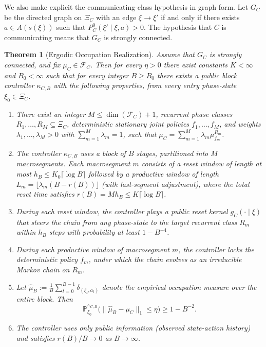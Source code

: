 \documentclass[12pt,a4paper]{article}
\newtheorem{theorem}{Theorem}[section]
\theoremstyle{definition}
\begin{document}
We also make explicit the communicating-class hypothesis in graph form. Let $G_C$ be the directed graph on $\Xi_C$ with an edge $\xi \to \xi'$ if and only if there exists $a \in A(s(\xi))$ such that $P_C^0(\xi' \mid \xi, a) > 0$. The hypothesis that $C$ is communicating means that $G_C$ is strongly connected.

\begin{theorem}[Ergodic Occupation Realization]\label{thm:ergodic-realization}
Assume that $G_C$ is strongly connected, and fix $\mu_C \in \mathcal{F}_C$. Then for every $\eta > 0$ there exist constants $K < \infty$ and $B_0 < \infty$ such that for every integer $B \geq B_0$ there exists a public block controller $\kappa_{C,B}$ with the following properties, from every entry phase-state $\xi_0 \in \Xi_C$.

\begin{enumerate}
\item There exist an integer $M \leq \dim(\mathcal{F}_C) + 1$, recurrent phase classes $R_1, \ldots, R_M \subseteq \Xi_C$, deterministic stationary joint policies $f_1, \ldots, f_M$, and weights $\lambda_1, \ldots, \lambda_M > 0$ with $\sum_{m=1}^M \lambda_m = 1$, such that $\mu_C = \sum_{m=1}^M \lambda_m \mu_{f_m}^{R_m}$.

\item The controller $\kappa_{C,B}$ uses a block of $B$ stages, partitioned into $M$ macrosegments.  Each macrosegment $m$ consists of a reset window of length at most $h_B \leq K_0 \lceil \log B \rceil$ followed by a productive window of length $L_m = \lfloor \lambda_m (B - r(B)) \rfloor$ (with last-segment adjustment), where the total reset time satisfies $r(B) = M h_B \leq K \lceil \log B \rceil$.

\item During each reset window, the controller plays a public reset kernel $g_C(\cdot \mid \xi)$ that steers the chain from any phase-state to the target recurrent class $R_m$ within $h_B$ steps with probability at least $1 - B^{-4}$.

\item During each productive window of macrosegment $m$, the controller locks the deterministic policy $f_m$, under which the chain evolves as an irreducible Markov chain on $R_m$.

\item Let $\hat\mu_B := \frac{1}{B} \sum_{t=0}^{B-1} \delta_{(\xi_t, a_t)}$ denote the empirical occupation measure over the entire block. Then
\[
\mathbb{P}_{\xi_0}^{\kappa_{C,B}}\!\bigl(\|\hat\mu_B - \mu_C\|_1 \leq \eta\bigr) \geq 1 - B^{-2}.
\]

\item The controller uses only public information (observed state-action history) and satisfies $r(B)/B \to 0$ as $B \to \infty$.
\end{enumerate}
\end{theorem}
\end{document}
